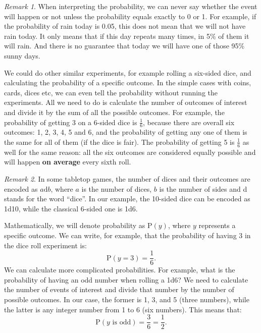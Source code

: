 \documentclass[
]{book}
\theoremstyle{definition}
\theoremstyle{definition}
\theoremstyle{definition}
\theoremstyle{definition}
\theoremstyle{remark}
\newtheorem*{remark}{Remark}
\begin{document}
\begin{remark}
When interpreting the probability, we can never say whether the event will happen or not unless the probability equals exactly to 0 or 1. For example, if the probability of rain today is 0.05, this does not mean that we will not have rain today. It only means that if this day repeats many times, in 5\% of them it will rain. And there is no guarantee that today we will have one of those 95\% sunny days.
\end{remark}

We could do other similar experiments, for example rolling a six-sided dice, and calculating the probability of a specific outcome. In the simple cases with coins, cards, dices etc, we can even tell the probability without running the experiments. All we need to do is calculate the number of outcomes of interest and divide it by the sum of all the possible outcomes. For example, the probability of getting 3 on a 6-sided dice is \(\frac{1}{6}\), because there are overall six outcomes: 1, 2, 3, 4, 5 and 6, and the probability of getting any one of them is the same for all of them (if the dice is fair). The probability of getting 5 is \(\frac{1}{6}\) as well for the same reason: all the six outcomes are considered equally possible and will happen \textbf{on average} every sixth roll.

\begin{remark}
In some tabletop games, the number of dices and their outcomes are encoded as \(a \mathrm{d} b\), where \(a\) is the number of dices, \(b\) is the number of sides and d stands for the word ``dice''. In our example, the 10-sided dice can be encoded as 1d10, while the classical 6-sided one is 1d6.
\end{remark}

Mathematically, we will denote probability as \(\mathrm{P}(y)\), where \(y\) represents a specific outcome. We can write, for example, that the probability of having 3 in the dice roll experiment is:
\begin{equation}
    \mathrm{P}(y=3) = \frac{1}{6} .
    \label{eq:ProbabilityExample01}
\end{equation}
We can calculate more complicated probabilities. For example, what is the probability of having an odd number when rolling a 1d6? We need to calculate the number of events of interest and divide that number by the number of possible outcomes. In our case, the former is 1, 3, and 5 (three numbers), while the latter is any integer number from 1 to 6 (six numbers). This means that:
\begin{equation}
    \mathrm{P}(y \text{ is odd}) = \frac{3}{6} = \frac{1}{2}.
    \label{eq:ProbabilityExample02}
\end{equation}
\end{document}
